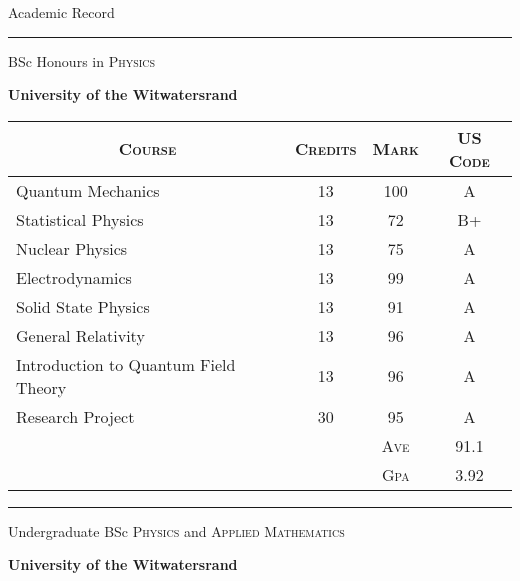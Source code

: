 \par{\centering \huge Academic Record\par}

\bigskip
\hrule
\bigskip

\par{\centering\Large \hypertarget{honours}{BSc Honours in \textsc{Physics}}\par}
{\centering \textbf{University of the Witwatersrand}\par}\normalsize
\begin{center}
	\begin{tabular}{lccc}
	\multicolumn{1}{c}{\textsc{Course}} & \textsc{Credits} & \textsc{Mark} & \textsc{US Code}\\ \hline
	Quantum Mechanics & 13 & 100 & A \\
	Statistical Physics & 13 & 72 & B+ \\
	Nuclear Physics & 13 & 75 & A \\
	Electrodynamics & 13 & 99 & A \\
	Solid State Physics & 13 & 91 & A \\
	General Relativity & 13 & 96 & A \\
	Introduction to Quantum Field Theory & 13 & 96 & A \\
	Research Project & 30 & 95 & A \\
	\cline{2-4}
	& & \textsc{Ave} & 91.1  \\
	& & \textsc{Gpa} & 3.92 
	\end{tabular}
\end{center}

\bigskip
\hrule
\bigskip

\par{\centering\Large \hypertarget{undergrad}{Undergraduate BSc \textsc{Physics} and \textsc{Applied Mathematics}}\par}
{\centering \textbf{University of the Witwatersrand}\par}\normalsize

